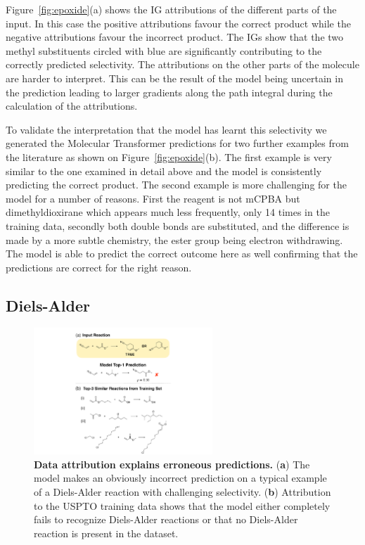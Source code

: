 Figure~\ref{fig:epoxide}(a) shows the IG attributions of the different parts of the input.  In this case the positive attributions favour the correct product while the negative attributions favour the incorrect product. The IGs show that the two methyl substituents circled with blue are significantly contributing to the correctly predicted selectivity. The attributions on the other parts of the molecule are harder to interpret. This can be the result of the model being uncertain in the prediction leading to larger gradients along the path integral during the calculation of the attributions. 

To validate the interpretation that the model has learnt this selectivity we generated the Molecular Transformer predictions for two further examples from the literature as shown on Figure~\ref{fig:epoxide}(b). The first example is very similar to the one examined in detail above and the model is consistently predicting the correct product. The second example is more challenging for the model for a number of reasons. First the reagent is not mCPBA but dimethyldioxirane which appears much less frequently, only 14 times in the training data, secondly both double bonds are substituted, and the difference is made by a more subtle chemistry, the ester group being electron withdrawing. The model is able to predict the correct outcome here as well confirming that the predictions are correct for the right reason. 

\subsection{Diels-Alder}

\begin{figure}[ht!]
    \centering
    \includegraphics[width=0.6\textwidth]{Chapters/Transformer/Figs/diels_alder.pdf}
    \caption{\label{fig:diels_alder} \textbf{Data attribution explains erroneous predictions.} (\textbf{a}) The model makes an obviously incorrect prediction on a typical example of a Diels-Alder reaction with challenging selectivity. (\textbf{b}) Attribution to the USPTO training data shows that the model either completely fails to recognize Diels-Alder reactions or that no Diels-Alder reaction is present in the dataset.}
\end{figure}

